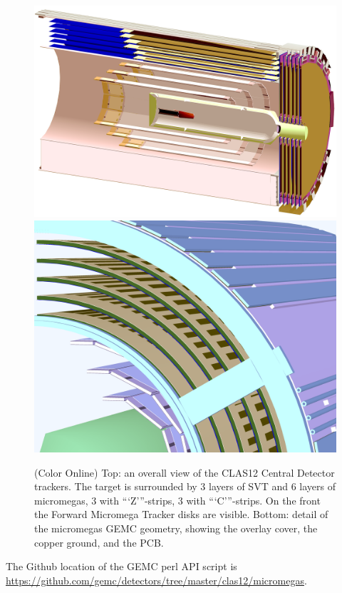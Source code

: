 \begin{figure}
	\centering
	\includegraphics[width=0.99\columnwidth,keepaspectratio]{img/bmtGeometry.png}
	\includegraphics[width=0.99\columnwidth,keepaspectratio]{img/bmtDetail.png}
	\caption{(Color Online) Top: an overall view of the CLAS12 Central Detector trackers. The target is surrounded by 3 layers of SVT and
            6 layers of micromegas, 3 with ```Z'''-strips, 3 with ```C'''-strips. On the front the Forward Micromega Tracker disks are visible.
            Bottom: detail of the micromegas GEMC geometry, showing the overlay cover, the copper ground, and the PCB.}
	\label{fig:bmtGeometry}
\end{figure}

The Github location of the GEMC perl API script is \url{https://github.com/gemc/detectors/tree/master/clas12/micromegas}.


